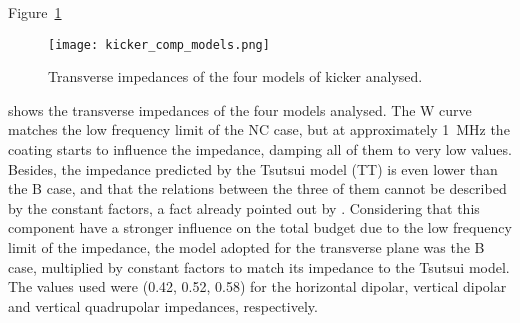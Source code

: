     Figure~\ref{fig:uncoupled_flux_impedance}
    \begin{figure}
        \centering
        \texttt{[image: kicker\_comp\_models.png]}
        \caption{Transverse impedances of the four models of kicker analysed.}
        \label{fig:uncoupled_flux_impedance}
    \end{figure}
    shows the transverse impedances of the four models analysed. The W curve matches the low frequency limit of the NC case, but at approximately \SI{1}{\mega\hertz} the coating starts to influence the impedance, damping all of them to very low values. Besides, the impedance predicted by the Tsutsui model (TT) is even lower than the B case, and that the relations between the three of them cannot be described by the constant  factors, a fact already pointed out by . Considering that this component have a stronger influence on the total budget due to the low frequency limit of the impedance, the model adopted for the transverse plane was the B case, multiplied by constant factors to match its impedance to the Tsutsui model. The values used were (0.42, 0.52, 0.58) for the horizontal dipolar, vertical dipolar and vertical quadrupolar impedances, respectively.

